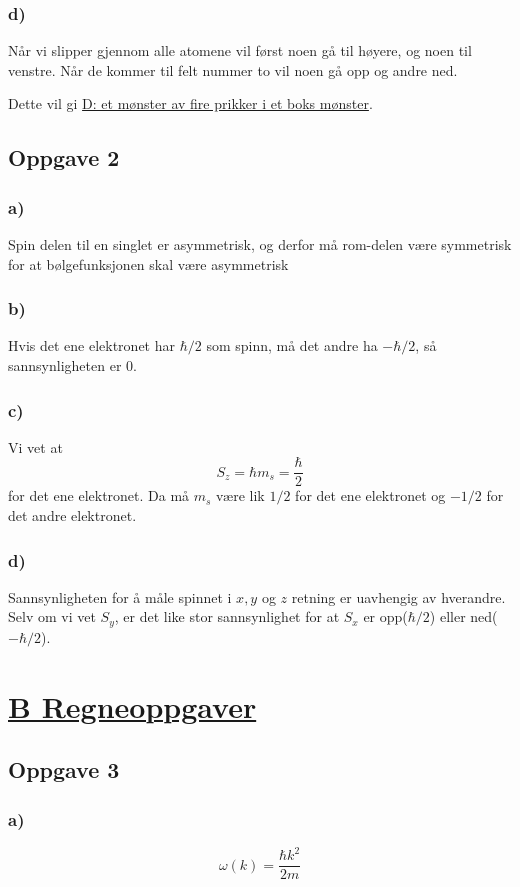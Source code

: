 \documentclass{article}
\begin{document}
\subsubsection*{d)}
Når vi slipper gjennom alle atomene vil først noen gå til høyere, og noen til venstre. Når de kommer til felt nummer to vil noen gå opp og andre ned. 

Dette vil gi \underline{D: et mønster av fire prikker i et boks mønster}. 


\subsection*{Oppgave 2}
\subsubsection*{a)}
Spin delen til en singlet er asymmetrisk, og derfor må rom-delen være symmetrisk for at bølgefunksjonen skal være asymmetrisk

\subsubsection*{b)}
Hvis det ene elektronet har $ℏ / 2$ som spinn, må det andre ha $-ℏ / 2$, så sannsynligheten er $0$. 

\subsubsection*{c)}
Vi vet at 
\[
S_z = ℏm_s = \frac{ℏ}{2} 
\]
for det ene elektronet. Da må $m_s$ være lik $1 / 2$ for det ene elektronet og $- 1 / 2$ for det andre elektronet. 

\subsubsection*{d)}
Sannsynligheten for å måle spinnet i $x,y$ og $z$ retning er uavhengig av hverandre. Selv om vi vet $S_y$, er det like stor sannsynlighet for at $S_x$ er opp($ℏ / 2$) eller ned($-ℏ / 2$).


\section*{\underline{B Regneoppgaver}}
\subsection*{Oppgave 3}
\subsubsection*{a)}
\[
ω(k) = \frac{ℏk^2}{2m} 
\]
\end{document}
